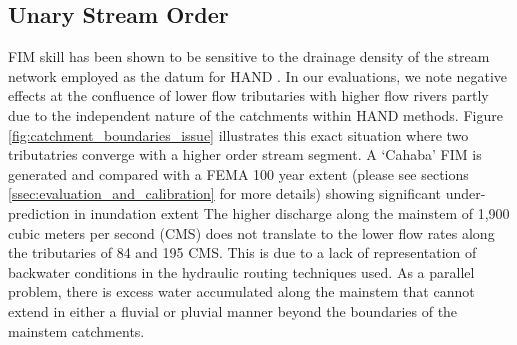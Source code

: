 \subsection{Unary Stream Order}
\label{ssec:unary_stream_order}
%
FIM skill has been shown to be sensitive to the drainage density of the stream network employed as the datum for HAND \cite{zhang2018comparative,mcgehee2016modified,li2020evaluation,nobre2016hand}.
In our evaluations, we note negative effects at the confluence of lower flow tributaries with higher flow rivers partly due to the independent nature of the catchments within HAND methods.
Figure \ref{fig:catchment_boundaries_issue} illustrates this exact situation where two tributatries converge with a higher order stream segment. 
A `Cahaba' FIM is generated and compared with a FEMA 100 year extent (please see sections \ref{ssec:evaluation_and_calibration} for more details) showing significant under-prediction in inundation extent
The higher discharge along the mainstem of 1,900 cubic meters per second (CMS) does not translate to the lower flow rates along the tributaries of 84 and 195 CMS. 
This is due to a lack of representation of backwater conditions in the hydraulic routing techniques used.
As a parallel problem, there is excess water accumulated along the mainstem that cannot extend in either a fluvial or pluvial manner beyond the boundaries of the mainstem catchments.

